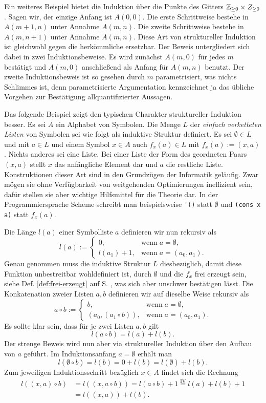 Ein weiteres Beispiel bietet die Induktion über die Punkte des
Gitters $\mathbb Z_{\ge 0}\times Z_{\ge 0}$. Sagen wir, der einzige
Anfang ist $A(0,0)$. Die erste Schrittweise bestehe in $A(m+1,n)$
unter Annahme $A(m,n)$. Die zweite Schrittweise bestehe in $A(m,n+1)$
unter Annahme $A(m,n)$. Diese Art von struktureller Induktion ist
gleichwohl gegen die herkömmliche ersetzbar. Der Beweis untergliedert
sich dabei in zwei Induktionsbeweise. Es wird zunächst
$A(m,0)$ für jedes $m$ bestätigt und $A(m,0)$ anschließend als
Anfang für $A(m,n)$ benutzt. Der zweite Induktionsbeweis ist so gesehen
durch $m$ parametrisiert, was nichts Schlimmes ist, denn
parametrisierte Argumentation kennzeichnet ja das übliche Vorgehen
zur Bestätigung allquantifizierter Aussagen.

Das folgende Beispiel zeigt den typischen Charakter struktureller
Induktion besser. Es sei $A$ ein Alphabet von Symbolen. Die Menge $L$
der \emph{einfach verketteten Listen}
von Symbolen sei wie folgt als induktive Struktur definiert. Es sei
$\emptyset\in L$ und mit $a\in L$ und einem Symbol $x\in A$ auch
$f_x(a)\in L$ mit $f_x(a):=(x,a)$. Nichts anderes sei eine Liste. Bei
einer Liste der Form des geordneten Paars $(x,a)$ stellt $x$ das
anfängliche Element dar und $a$ die restliche Liste. Konstruktionen
dieser Art sind in den Grundzügen der Informatik geläufig. Zwar mögen sie
ohne Verfügbarkeit von weitgehenden Optimierungen ineffizient sein, dafür
stellen sie aber wichtige Hilfsmittel für die Theorie dar. In der
Programmiersprache Scheme schreibt man beispielsweise \verb|'()| statt
$\emptyset$ und \verb|(cons x a)| statt $f_x(a)$.

Die Länge $l(a)$ einer Symbolliste $a$ definieren wir nun rekursiv als
\[l(a) := \begin{cases}
0, & \text{wenn}\; a=\emptyset,\\
l(a_1)+1, & \text{wenn}\; a = (a_0,a_1).
\end{cases}\]
Genau genommen muss die induktive Struktur $L$ diesbezüglich, damit diese Funktion
unbestreitbar wohldefiniert ist, durch $\emptyset$ und die $f_x$ frei
erzeugt sein, siehe Def. \ref{def:frei-erzeugt} auf S. \pageref{def:frei-erzeugt},
was sich aber unschwer bestätigen lässt. Die Konkatenation zweier Listen $a,b$
definieren wir auf dieselbe Weise rekursiv als
\[a\circ b := \begin{cases}
b, & \text{wenn}\; a=\emptyset,\\
(a_0, (a_1\circ b)), & \text{wenn}\; a=(a_0,a_1).
\end{cases}\]
Es sollte klar sein, dass für je zwei Listen $a,b$ gilt
\[l(a\circ b) = l(a) + l(b).\]
Der strenge Beweis wird nun aber via struktureller Induktion über den
Aufbau von $a$ geführt. Im Induktionsanfang $a=\emptyset$ erhält man
\[l(\emptyset\circ b) = l(b) = 0 + l(b) = l(\emptyset) + l(b).\]
Zum jeweiligen Induktionsschritt bezüglich $x\in A$ findet sich die
Rechnung
\begin{align*}
l((x, a)\circ b) &= l((x, a\circ b)) = l(a\circ b) + 1
\stackrel{\text{IV}}= l(a) + l(b) + 1\\
&= l((x, a)) + l(b).
\end{align*}

